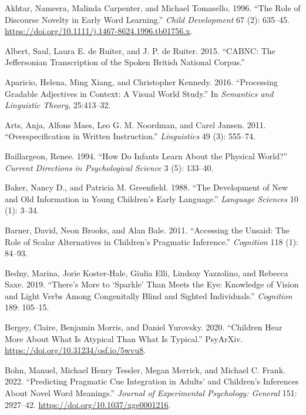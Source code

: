 \documentclass{ucetd}
\newlength{\cslhangindent}
\newenvironment{cslreferences}%
{\setlength{\parindent}{0pt}%
\everypar{\setlength{\hangindent}{\cslhangindent}}\ignorespaces}%
{\par}
\begin{document}
\hypertarget{refs}{}
\begin{cslreferences}
\leavevmode\hypertarget{ref-akhtar_role_1996}{}%
Akhtar, Nameera, Malinda Carpenter, and Michael Tomasello. 1996. ``The
Role of Discourse Novelty in Early Word Learning.'' \emph{Child
Development} 67 (2): 635--45.
\url{https://doi.org/10.1111/j.1467-8624.1996.tb01756.x}.

\leavevmode\hypertarget{ref-albert_cabnc_2015}{}%
Albert, Saul, Laura E. de Ruiter, and J. P. de Ruiter. 2015. ``CABNC:
The Jeffersonian Transcription of the Spoken British National Corpus.''

\leavevmode\hypertarget{ref-aparicio2016processing}{}%
Aparicio, Helena, Ming Xiang, and Christopher Kennedy. 2016.
``Processing Gradable Adjectives in Context: A Visual World Study.'' In
\emph{Semantics and Linguistic Theory}, 25:413--32.

\leavevmode\hypertarget{ref-arts_overspecification_2011}{}%
Arts, Anja, Alfons Maes, Leo G. M. Noordman, and Carel Jansen. 2011.
``Overspecification in Written Instruction.'' \emph{Linguistics} 49 (3):
555--74.

\leavevmode\hypertarget{ref-baillargeon1994}{}%
Baillargeon, Renee. 1994. ``How Do Infants Learn About the Physical
World?'' \emph{Current Directions in Psychological Science} 3 (5):
133--40.

\leavevmode\hypertarget{ref-baker1988}{}%
Baker, Nancy D., and Patricia M. Greenfield. 1988. ``The Development of
New and Old Information in Young Children's Early Language.''
\emph{Language Sciences} 10 (1): 3--34.

\leavevmode\hypertarget{ref-barner_accessing_2011}{}%
Barner, David, Neon Brooks, and Alan Bale. 2011. ``Accessing the Unsaid:
The Role of Scalar Alternatives in Children's Pragmatic Inference.''
\emph{Cognition} 118 (1): 84--93.

\leavevmode\hypertarget{ref-bedny2019}{}%
Bedny, Marina, Jorie Koster-Hale, Giulia Elli, Lindsay Yazzolino, and
Rebecca Saxe. 2019. ``There's More to `Sparkle' Than Meets the Eye:
Knowledge of Vision and Light Verbs Among Congenitally Blind and Sighted
Individuals.'' \emph{Cognition} 189: 105--15.

\leavevmode\hypertarget{ref-bergey_morris_2020}{}%
Bergey, Claire, Benjamin Morris, and Daniel Yurovsky. 2020. ``Children
Hear More About What Is Atypical Than What Is Typical.'' PsyArXiv.
\url{https://doi.org/10.31234/osf.io/5wvu8}.

\leavevmode\hypertarget{ref-bohn_predicting_2022}{}%
Bohn, Manuel, Michael Henry Tessler, Megan Merrick, and Michael C.
Frank. 2022. ``Predicting Pragmatic Cue Integration in Adults' and
Children's Inferences About Novel Word Meanings.'' \emph{Journal of
Experimental Psychology: General} 151: 2927--42.
\url{https://doi.org/10.1037/xge0001216}.


\end{cslreferences}
\end{document}
